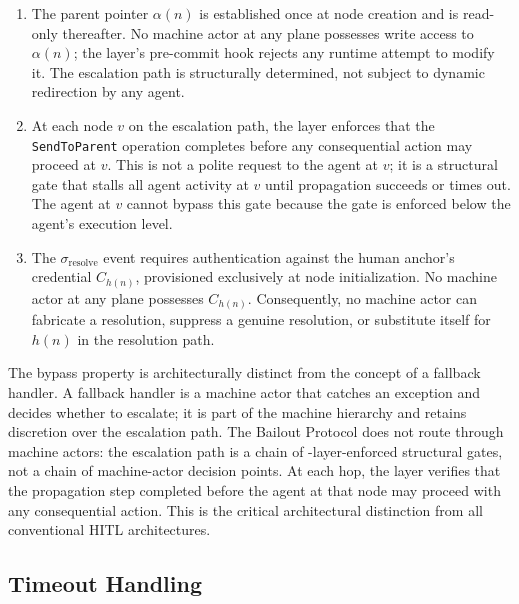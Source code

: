 \begin{enumerate}\itemsep=0pt
\item[$\mathbf{M1\colon}$ \textbf{Immutable parent pointer (Invariant I2).}] The parent pointer $\alpha(n)$ is established once at node creation and is read-only thereafter. No machine actor at any plane possesses write access to $\alpha(n)$; the \fact{} layer's pre-commit hook rejects any runtime attempt to modify it. The escalation path is structurally determined, not subject to dynamic redirection by any agent.

\item[$\mathbf{M2\colon}$ \textbf{Pre-commit enforcement at each hop.}] At each node $v$ on the escalation path, the \fact{} layer enforces that the \texttt{SendToParent} operation completes before any consequential action may proceed at $v$. This is not a polite request to the agent at $v$; it is a structural gate that stalls all agent activity at $v$ until propagation succeeds or times out. The agent at $v$ cannot bypass this gate because the gate is enforced below the agent's execution level.

\item[$\mathbf{M3\colon}$ \textbf{Credential binding on $\sigma_{\text{resolve}}$.}] The $\sigma_{\text{resolve}}$ event requires authentication against the human anchor's credential $C_{h(n)}$, provisioned exclusively at node initialization. No machine actor at any plane possesses $C_{h(n)}$. Consequently, no machine actor can fabricate a resolution, suppress a genuine resolution, or substitute itself for $h(n)$ in the resolution path.
\end{enumerate}

The bypass property is architecturally distinct from the concept of a fallback handler. A fallback handler is a machine actor that catches an exception and decides whether to escalate; it is part of the machine hierarchy and retains discretion over the escalation path. The Bailout Protocol does not route through machine actors: the escalation path is a chain of \fact{}-layer-enforced structural gates, not a chain of machine-actor decision points. At each hop, the \fact{} layer verifies that the propagation step completed before the agent at that node may proceed with any consequential action. This is the critical architectural distinction from all conventional HITL architectures.

\subsection{Timeout Handling}
\label{sec:bp-timeouts}

